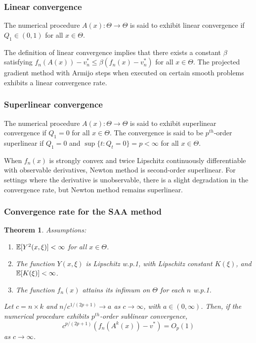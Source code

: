 \documentclass[usepdftitle=false, aspectratio=169]{beamer}
\newtheorem{theo}{Theorem}
\begin{document}
\begin{frame}
\frametitle{Linear convergence}

\begin{definition}
The numerical procedure $A(x) : \Theta \rightarrow \Theta$ is said to exhibit linear convergence if $Q_1 \in (0, 1)$ for all $x \in \Theta$.
\end{definition}

\mbox{}

The definition of linear convergence implies that there exists a constant $\beta$ satisfying $f_n ( A (x)) - v_n^* \leq \beta (f_n(x) - v_n^*)$ for all $x \in \Theta$.
The projected gradient method with Armijo steps when executed on certain smooth problems exhibits a linear convergence rate.

\end{frame}

\begin{frame}
\frametitle{Superlinear convergence}

\begin{definition}
The numerical procedure $A(x) : \Theta \rightarrow \Theta$ is said to exhibit superlinear convergence if $Q_1 = 0$ for all $x \in \Theta$.
The convergence is said to be $p^{th}$-order superlinear if $Q_1 = 0$ and $\sup \{ t : Q_t = 0 \} = p < \infty$ for all $x \in \Theta$.
\end{definition}

\mbox{}

When $f_n(x)$ is strongly convex and twice Lipschitz continuously differentiable with observable derivatives, Newton method is second-order superlinear.
For settings where the derivative is unobservable, there is a slight degradation in the convergence rate, but Newton method remains superlinear.

\end{frame}

\begin{frame}
\frametitle{Convergence rate for the SAA method}

\begin{theo}
Assumptions:
\begin{enumerate}
\item
${\mathbb{E}}[ Y^2 ( x , \xi)] < \infty$ for all $x \in \Theta$.
\item
The function $Y(x, \xi)$ is Lipschitz w.p.1, with Lipschitz constant $K(\xi)$, and ${\mathbb{E}}[K(\xi)] < \infty$.
\item
The function $f_n(x)$ attains its infimum on $\Theta$ for each $n$ w.p.1.
\end{enumerate}
Let $c = n \times k$ and $n/c^{1 /( 2p + 1 )} \rightarrow a$ as $c \rightarrow \infty$, with $a \in (0, \infty)$.
Then, if the numerical procedure exhibits $p^{th}$-order sublinear convergence,
$$
c^{p /( 2p + 1 )} \left( f_n ( A^k ( x )) - v^* \right) = O_p(1)
$$
as $c \rightarrow \infty$.
\end{theo}

\end{frame}
\end{document}
